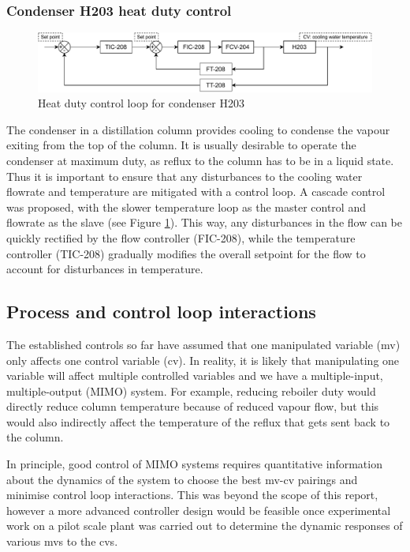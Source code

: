 \subsubsection{Condenser H203 heat duty control}%
\begin{figure}
    \centering
    \includegraphics[width=\linewidth]{chapters/4-operation-control/4-Figures/H203-TC.pdf}
    \caption{Heat duty control loop for condenser H203}
    \label{fig:S203C-TC}
\end{figure}
The condenser in a distillation column provides cooling to condense the vapour exiting from the top of the column. It is usually desirable to operate the condenser at maximum duty, as reflux to the column has to be in a liquid state. Thus it is important to ensure that any disturbances to the cooling water flowrate and temperature are mitigated with a control loop. A cascade control was proposed, with the slower temperature loop as the master control and flowrate as the slave (see Figure \ref{fig:S203C-TC}). This way, any disturbances in the flow can be quickly rectified by the flow controller (FIC-208), while the temperature controller (TIC-208) gradually modifies the overall setpoint for the flow to account for disturbances in temperature.

\subsection{Process and control loop interactions}
The established controls so far have assumed that one manipulated variable (mv) only affects one control variable (cv). In reality, it is likely that manipulating one variable will affect multiple controlled variables and we have a multiple-input, multiple-output (MIMO) system. For example, reducing reboiler duty would directly reduce column temperature because of reduced vapour flow, but this would also indirectly affect the temperature of the reflux that gets sent back to the column. 

In principle, good control of MIMO systems requires quantitative information about the dynamics of the system to choose the best mv-cv pairings and minimise control loop interactions. This was beyond the scope of this report, however a more advanced controller design would be feasible once experimental work on a pilot scale plant was carried out to determine the dynamic responses of various mvs to the cvs.

